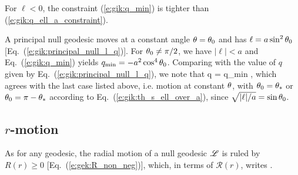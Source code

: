 \begin{remark}
For $\ell < 0$, the constraint (\ref{e:gik:q_min}) is tighter than
(\ref{e:gik:q_ell_a_constraint}).
\end{remark}

\begin{example}
A principal null geodesic moves at a constant angle
$\theta=\theta_0$ and has
$\ell = a\sin^2\theta_0$ [Eq.~(\ref{e:gik:principal_null_l_q})].
For $\theta_0\neq \pi/2$, we have $|\ell| < a$ and
Eq.~(\ref{e:gik:q_min}) yields $q_{\rm min} = - a^2 \cos^4\theta_0$.
Comparing with the value of $q$ given by Eq.~(\ref{e:gik:principal_null_l_q}),
we note that
\be
     q = q_{\rm min} ,
\ee
which agrees with the last case listed above, i.e. motion at constant
$\theta$, with $\theta_0 = \theta_*$ or $\theta_0 = \pi - \theta_*$ according
to Eq.~(\ref{e:gik:th_s_ell_over_a}), since $\sqrt{|\ell|/a} = \sin\theta_0$.
\end{example}

\subsection{$r$-motion}

As for any geodesic, the radial motion of a null geodesic $\mathscr{L}$ is ruled by
$R(r)\geq 0$ [Eq.~(\ref{e:gek:R_non_neg})], which, in terms of $\mathcal{R}(r)$,
writes
\be \label{e:mcR_non_neg}
    .
\ee


